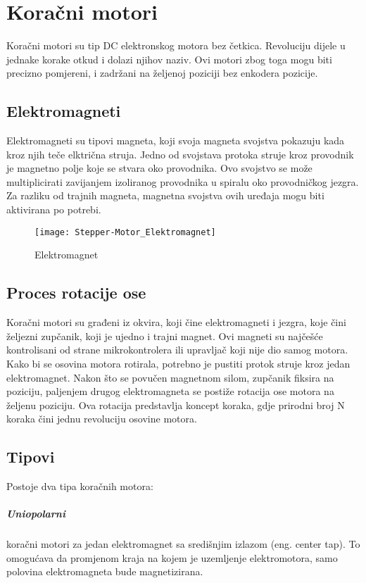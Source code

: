 \documentclass[../Document.tex]{subfiles}
\begin{document}
\section{Koračni motori}
Koračni motori su tip DC elektronskog motora bez četkica. Revoluciju dijele u jednake korake otkud i dolazi njihov naziv. Ovi motori zbog toga mogu biti precizno pomjereni, i zadržani na željenoj poziciji bez enkodera pozicije.
\vspace{0.5cm}
\subsection{Elektromagneti}
Elektromagneti su tipovi magneta, koji svoja magneta svojstva pokazuju kada kroz njih teče elktrična struja. Jedno od svojstava protoka struje kroz provodnik je magnetno polje koje se stvara oko provodnika. Ovo svojstvo se može multiplicirati zavijanjem izoliranog provodnika u spiralu oko provodničkog jezgra. Za razliku od trajnih magneta, magnetna svojstva ovih uređaja mogu biti aktivirana po potrebi.\\

\begin{figure}[h]
    \centering
    \hspace{1.8cm}
    \texttt{[image: Stepper-Motor\_Elektromagnet]}
    \caption{Elektromagnet}
\end{figure}

\subsection{Proces rotacije ose}
Koračni motori su građeni iz okvira, koji čine elektromagneti i jezgra, koje čini željezni zupčanik, koji je ujedno i trajni magnet. Ovi magneti su najčešće kontrolisani od strane mikrokontrolera ili upravljač koji nije dio samog motora. Kako bi se osovina motora rotirala, potrebno je pustiti protok struje kroz jedan elektromagnet. Nakon što se povučen magnetnom silom, zupčanik fiksira na poziciju, paljenjem drugog elektromagneta se postiže rotacija ose motora na željenu poziciju. Ova rotacija predstavlja koncept koraka, gdje prirodni broj N koraka čini jednu revoluciju osovine motora.

\subsection{Tipovi}
Postoje dva tipa koračnih motora:

\subparagraph{Uniopolarni} \noindent koračni motori za jedan elektromagnet sa središnjim izlazom (eng. center tap). To omogućava da promjenom kraja na kojem je uzemljenje elektromotora, samo polovina elektromagneta bude magnetizirana.\\
\end{document}
